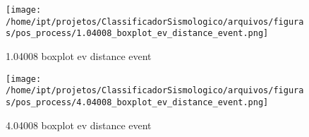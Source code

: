                     \begin{figure}[H]
                        \centering
                        \texttt{[image: /home/ipt/projetos/ClassificadorSismologico/arquivos/figuras/pos\_process/1.04008\_boxplot\_ev\_distance\_event.png]}
                        \caption{1.04008 boxplot ev distance event}
                        \label{fig:1.04008_boxplot_ev_distance_event}
                    \end{figure}
                

                    \begin{figure}[H]
                        \centering
                        \texttt{[image: /home/ipt/projetos/ClassificadorSismologico/arquivos/figuras/pos\_process/4.04008\_boxplot\_ev\_distance\_event.png]}
                        \caption{4.04008 boxplot ev distance event}
                        \label{fig:4.04008_boxplot_ev_distance_event}
                    \end{figure}
                
